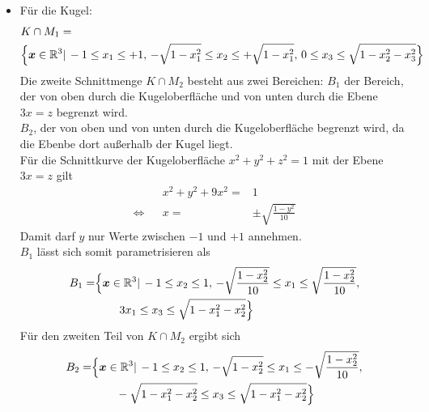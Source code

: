 {\begin{itemize}
\item F\"ur die Kugel: 
\begin{align*}
&K\cap M_1=\\&\Bigl\{\boldsymbol x\in \mathbb{R}^3|\, -1\leq x_1\leq +1,\, -\sqrt{1-x_1^2}\leq x_2\leq +\sqrt{1-x_1^2},\, 0\leq x_3\leq \sqrt{1-x_2^2-x_3^2}\Bigr\}
\end{align*}
Die zweite Schnittmenge $K\cap M_2$ besteht aus zwei Bereichen: 
$B_1$ der Bereich, der von oben durch die Kugeloberfl\"ache und von unten durch die Ebene $3x=z$ begrenzt wird. \\
$B_2$, der von oben und von unten durch die Kugeloberfl\"ache begrenzt wird, da die Ebenbe dort außerhalb der Kugel liegt. \\
F\"ur die Schnittkurve der Kugeloberfl\"ache $x^2+y^2+z^2=1$ mit der Ebene $3x=z$ gilt
\begin{align*}
&&x^2+y^2+9x^2=&1\\
\Leftrightarrow&&x=&\pm\sqrt{\frac{1-y^2}{10}}
\end{align*}
Damit darf $y$ nur Werte zwischen $-1$ und $+1$ annehmen.\\
$B_1$ l\"asst sich somit parametrisieren als
\begin{align*}
B_1=&\Bigl\{\boldsymbol x\in \mathbb{R}^3|\, -1\leq x_2\leq 1,\, -\sqrt{\frac{1-x_2^2}{10}}\leq x_1\leq \sqrt{\frac{1-x_2^2}{10}},\\
&\qquad \,3x_1\leq x_3\leq \sqrt{1-x_1^2-x_2^2}\Bigr\}\\
\end{align*}
F\"ur den zweiten Teil von $K\cap M_2$ ergibt sich
\begin{align*}
B_2=&\Bigl\{\boldsymbol x\in \mathbb{R}^3|\, -1\leq x_2\leq 1,\, -\sqrt{1-x_2^2}\leq x_1\leq -\sqrt{\frac{1-x_2^2}{10}},\\
&\qquad \,-\sqrt{1-x_1^2-x_2^2}\leq x_3\leq \sqrt{1-x_1^2-x_2^2}\Bigr\}\\
\end{align*}


\end{itemize}}
